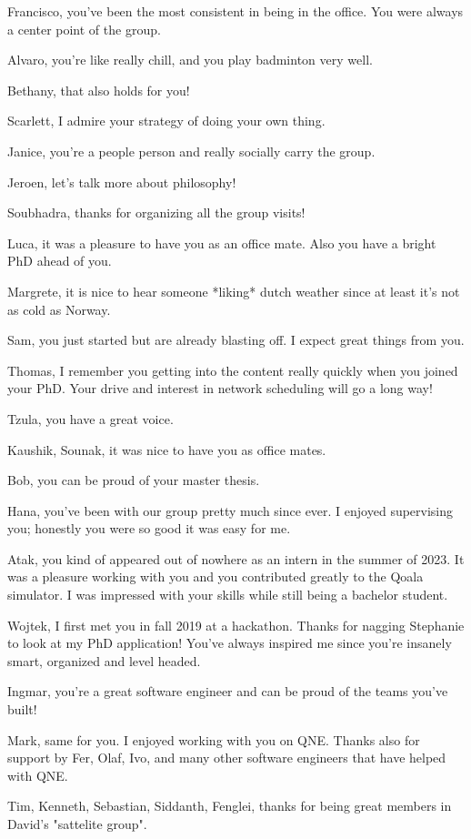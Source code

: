 Francisco, you've been the most consistent in being in the office. You were always a center point of the group.

Alvaro, you're like really chill, and you play badminton very well. 

Bethany, that also holds for you!

Scarlett, I admire your strategy of doing your own thing.

Janice, you're a people person and really socially carry the group.

Jeroen, let's talk more about philosophy!

Soubhadra, thanks for organizing all the group visits!

Luca, it was a pleasure to have you as an office mate. Also you have a bright PhD ahead of you.

Margrete, it is nice to hear someone *liking* dutch weather since at least it's not as cold as Norway.

Sam, you just started but are already blasting off. I expect great things from you.

Thomas, I remember you getting into the content really quickly when you joined your PhD. Your drive and interest in network scheduling will go a long way!

Tzula, you have a great voice.

Kaushik, Sounak, it was nice to have you as office mates.

Bob, you can be proud of your master thesis.

Hana, you've been with our group pretty much since ever. I enjoyed supervising you; honestly you were so good it was easy for me.

Atak, you kind of appeared out of nowhere as an intern in the summer of 2023. It was a pleasure working with you and you contributed greatly to the Qoala simulator. I was impressed with your skills while still being a bachelor student.

Wojtek, I first met you in fall 2019 at a hackathon. Thanks for nagging Stephanie to look at my PhD application! You've always inspired me since you're insanely smart, organized and level headed.

Ingmar, you're a great software engineer and can be proud of the teams you've built!

Mark, same for you. I enjoyed working with you on QNE. Thanks also for support by Fer, Olaf, Ivo, and many other software engineers that have helped with QNE.

Tim, Kenneth, Sebastian, Siddanth, Fenglei, thanks for being great members in David's "sattelite group".

